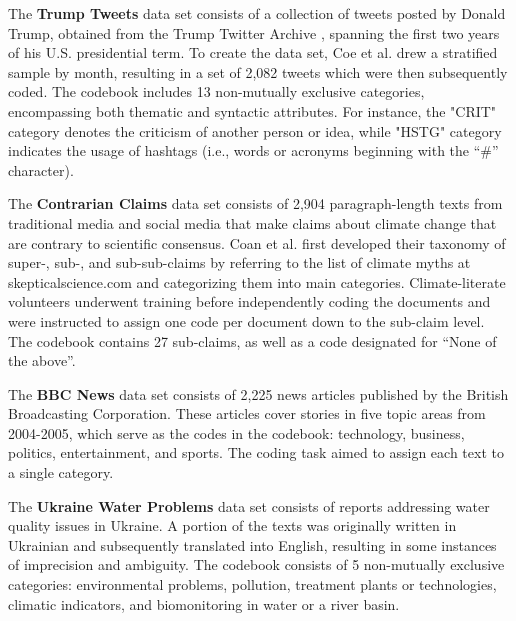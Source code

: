 \documentclass{article}
\begin{document}
The \textbf{Trump Tweets} data set consists of a collection of tweets posted by Donald Trump, obtained from the Trump Twitter Archive \cite{brown_search_nodate}, spanning the first two years of his U.S. presidential term. To create the data set, Coe et al. \cite{coe2020marginalized} drew a stratified sample by month, resulting in a set of 2,082 tweets which were then subsequently coded. The codebook includes 13 non-mutually exclusive categories, encompassing both thematic and syntactic attributes. For instance, the "CRIT" category denotes the criticism of another person or idea, while "HSTG" category indicates the usage of hashtags (i.e., words or acronyms beginning with the “\#” character).

The \textbf{Contrarian Claims} data set consists of 2,904 paragraph-length texts from traditional media and social media that make claims about climate change that are contrary to scientific consensus. Coan et al. \cite{coan_computer-assisted_2021} first developed their taxonomy of super-, sub-, and sub-sub-claims by referring to the list of climate myths at skepticalscience.com \cite{noauthor_global_nodate} and categorizing them into main categories. Climate-literate volunteers underwent training before independently coding the documents and were instructed to assign one code per document down to the sub-claim level. The codebook contains 27 sub-claims, as well as a code designated for “None of the above”.

The \textbf{BBC News} data set \cite{greene_practical_2006} consists of 2,225 news articles published by the British Broadcasting Corporation. These articles cover stories in five topic areas from 2004-2005, which serve as the codes in the codebook: technology, business, politics, entertainment, and sports. The coding task aimed to assign each text to a single category. 

The \textbf{Ukraine Water Problems} data set \cite{afanasyev_river_2013} consists of reports addressing water quality issues in Ukraine. A portion of the texts was originally written in Ukrainian and subsequently translated into English, resulting in some instances of imprecision and ambiguity. The codebook consists of 5 non-mutually exclusive categories: environmental problems, pollution, treatment plants or technologies, climatic indicators, and biomonitoring in water or a river basin.
\end{document}
